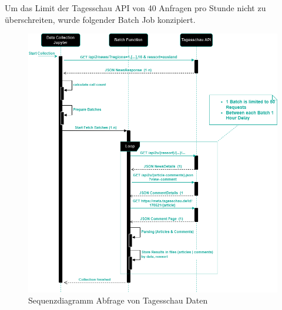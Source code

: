 Um das Limit der Tagesschau API von 40 Anfragen pro Stunde nicht zu überschreiten, wurde folgender Batch Job konzipiert. 

\begin{figure}
    \centering
    \includegraphics[width=1\linewidth]{abbildungen/image.png}
    \caption{Sequenzdiagramm Abfrage von Tagesschau Daten}
    \label{fig:Sequenzdiagramm Abfrage von Tagesschau Daten}
\end{figure}